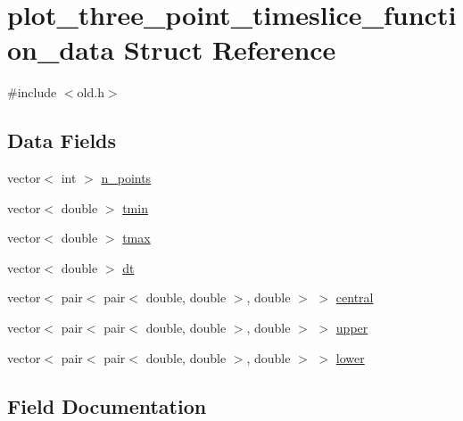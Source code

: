 \hypertarget{structplot__three__point__timeslice__function__data}{}\section{plot\+\_\+three\+\_\+point\+\_\+timeslice\+\_\+function\+\_\+data Struct Reference}
\label{structplot__three__point__timeslice__function__data}


{\ttfamily \#include $<$old.\+h$>$}

\subsection*{Data Fields}
\begin{DoxyCompactItemize}
\item 
vector$<$ int $>$ \mbox{\hyperlink{structplot__three__point__timeslice__function__data_afe5fe23f41b7167fcf1e559f76122749}{n\+\_\+points}}
\item 
vector$<$ double $>$ \mbox{\hyperlink{structplot__three__point__timeslice__function__data_ae81e72c32aa36911997442efd94499b4}{tmin}}
\item 
vector$<$ double $>$ \mbox{\hyperlink{structplot__three__point__timeslice__function__data_a3ad702b7c32060f7ac6c589939b9c97a}{tmax}}
\item 
vector$<$ double $>$ \mbox{\hyperlink{structplot__three__point__timeslice__function__data_a86ae5f43e4e1e3f2f7170c198be5bc08}{dt}}
\item 
vector$<$ pair$<$ pair$<$ double, double $>$, double $>$ $>$ \mbox{\hyperlink{structplot__three__point__timeslice__function__data_a1df03fac4f39845fd74382159532933c}{central}}
\item 
vector$<$ pair$<$ pair$<$ double, double $>$, double $>$ $>$ \mbox{\hyperlink{structplot__three__point__timeslice__function__data_a0935db9c0d1c5daab9e73d0403e7aec6}{upper}}
\item 
vector$<$ pair$<$ pair$<$ double, double $>$, double $>$ $>$ \mbox{\hyperlink{structplot__three__point__timeslice__function__data_a73d926bd749870b71654ed92becce7a6}{lower}}
\end{DoxyCompactItemize}


\subsection{Field Documentation}
\mbox{\label{structplot__three__point__timeslice__function__data_a1df03fac4f39845fd74382159532933c}} 
